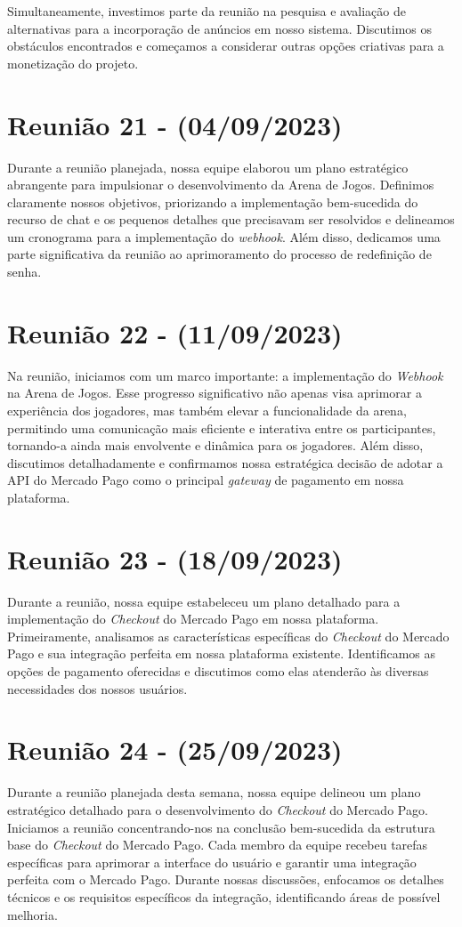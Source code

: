 \begin{apendicesenv}
Simultaneamente, investimos parte da reunião na pesquisa e avaliação de alternativas para a incorporação de anúncios em nosso sistema. Discutimos os obstáculos encontrados e começamos a considerar outras opções criativas para a monetização do projeto.

\section{Reunião 21 - (04/09/2023)}
Durante a reunião planejada, nossa equipe elaborou um plano estratégico abrangente para impulsionar o desenvolvimento da Arena de Jogos. Definimos claramente nossos objetivos, priorizando a implementação bem-sucedida do recurso de chat e os pequenos detalhes que precisavam ser resolvidos e delineamos um cronograma para a implementação do \textit{webhook}. Além disso, dedicamos uma parte significativa da reunião ao aprimoramento do processo de redefinição de senha. 

\section{Reunião 22 - (11/09/2023)}
Na reunião, iniciamos com um marco importante: a implementação do \textit{Webhook} na Arena de Jogos. Esse progresso significativo não apenas visa aprimorar a experiência dos jogadores, mas também elevar a funcionalidade da arena, permitindo uma comunicação mais eficiente e interativa entre os participantes, tornando-a ainda mais envolvente e dinâmica para os jogadores. Além disso, discutimos detalhadamente e confirmamos nossa estratégica decisão de adotar a API do Mercado Pago como o principal \textit{gateway} de pagamento em nossa plataforma.

\section{Reunião 23 - (18/09/2023)}
Durante a reunião, nossa equipe estabeleceu um plano detalhado para a implementação do \textit{Checkout} do Mercado Pago em nossa plataforma. Primeiramente, analisamos as características específicas do \textit{Checkout} do Mercado Pago e sua integração perfeita em nossa plataforma existente. Identificamos as opções de pagamento oferecidas e discutimos como elas atenderão às diversas necessidades dos nossos usuários. 

\section{Reunião 24 - (25/09/2023)}
Durante a reunião planejada desta semana, nossa equipe delineou um plano estratégico detalhado para o desenvolvimento do \textit{Checkout} do Mercado Pago. Iniciamos a reunião concentrando-nos na conclusão bem-sucedida da estrutura base do \textit{Checkout} do Mercado Pago. Cada membro da equipe recebeu tarefas específicas para aprimorar a interface do usuário e garantir uma integração perfeita com o Mercado Pago. Durante nossas discussões, enfocamos os detalhes técnicos e os requisitos específicos da integração, identificando áreas de possível melhoria.


\end{apendicesenv}
